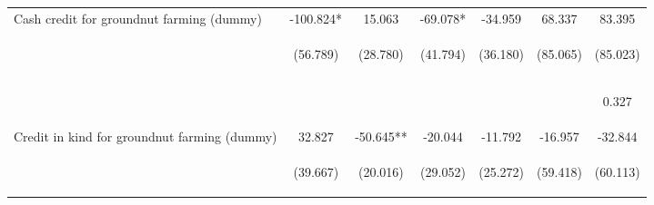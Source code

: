 \begin{center}
\begin{tabular}{lcccccc}
Cash credit for groundnut farming (dummy) & -100.824* & 15.063 & -69.078* & -34.959 & 68.337 & 83.395 \\
 & \begin{footnotesize}(56.789)\end{footnotesize} & \begin{footnotesize}(28.780)\end{footnotesize} & \begin{footnotesize}(41.794)\end{footnotesize} & \begin{footnotesize}(36.180)\end{footnotesize} & \begin{footnotesize}(85.065)\end{footnotesize} & \begin{footnotesize}(85.023)\end{footnotesize} \\
\vspace{4pt} & \begin{footnotesize}[0.076]\end{footnotesize} & \begin{footnotesize}[0.601]\end{footnotesize} & \begin{footnotesize}[0.098]\end{footnotesize} & \begin{footnotesize}[0.334]\end{footnotesize} & \begin{footnotesize}[0.422]\end{footnotesize} & \begin{footnotesize}0.327\end{footnotesize} \\
Credit in kind for groundnut farming (dummy) & 32.827 & -50.645** & -20.044 & -11.792 & -16.957 & -32.844 \\
 & \begin{footnotesize}(39.667)\end{footnotesize} & \begin{footnotesize}(20.016)\end{footnotesize} & \begin{footnotesize}(29.052)\end{footnotesize} & \begin{footnotesize}(25.272)\end{footnotesize} & \begin{footnotesize}(59.418)\end{footnotesize} & \begin{footnotesize}(60.113)\end{footnotesize} \\

\end{tabular}
\end{center}

